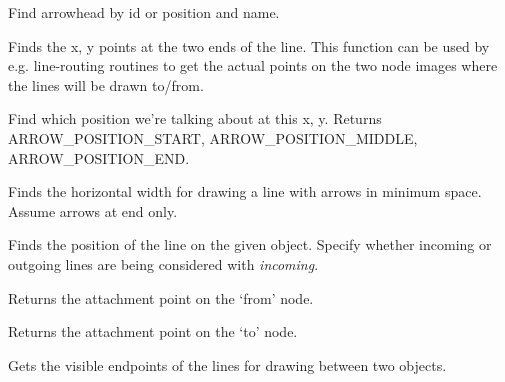 Find arrowhead by id or position and name.



Finds the x, y points at the two ends of the line. This function can be
used by e.g. line-routing routines to get the actual points on the two
node images where the lines will be drawn to/from.



Find which position we're talking about at this x, y.
Returns ARROW\_POSITION\_START, ARROW\_POSITION\_MIDDLE, ARROW\_POSITION\_END.



Finds the horizontal width for drawing a line with arrows in minimum
space. Assume arrows at end only.



Finds the position of the line on the given object. Specify whether incoming or outgoing lines are
being considered with {\it incoming}.



Returns the attachment point on the `from' node.



Returns the attachment point on the `to' node.



Gets the visible endpoints of the lines for drawing between two objects.



